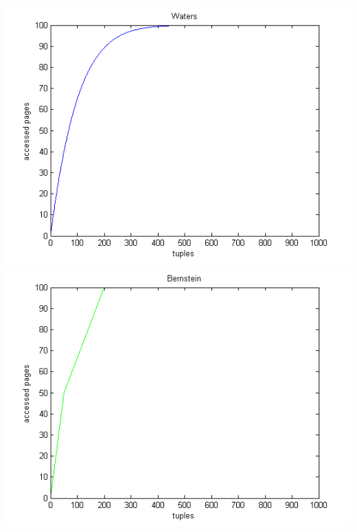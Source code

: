 \documentclass[11pt,a4paper]{scrartcl}
\begin{document}
\includegraphics[scale=.9]{waters}\\
\includegraphics[scale=.9]{bernstein}


\end{document}

